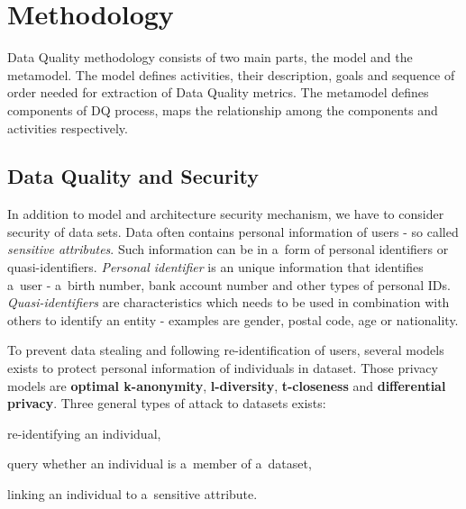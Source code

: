 \chapter{Methodology}\label{ch:methodology}

Data Quality methodology consists of two main parts, the model and the metamodel.
The model defines activities, their description, goals and sequence of order needed for extraction of Data Quality metrics.
The metamodel defines components of DQ process, maps the relationship among the components and activities respectively.

\section{Data Quality and Security}

In addition to model and architecture security mechanism, we have to consider security of data sets.
Data often contains personal information of users - so called \textit{sensitive attributes}.
Such information can be in a~form of personal identifiers or quasi-identifiers.
\textit{Personal identifier} is an unique information that identifies a~user - a~birth number, bank account number and other types of personal IDs.
\textit{Quasi-identifiers} are characteristics which needs to be used in combination with others to identify an entity - examples are gender, postal code, age or nationality.

To prevent data stealing and following re-identification of users, several models exists to protect personal information of individuals in dataset.
Those privacy models are \textbf{optimal k-anonymity}, \textbf{l-diversity}, \textbf{t-closeness} and \textbf{differential privacy}.
Three general types of attack to datasets exists:
\begin{enumerate*}[label=(\roman*)]
    \item \label{itm:reident} re-identifying an individual,
    \item \label{itm:query} query whether an individual is a~member of a~dataset,
    \item \label{itm:linking} linking an individual to a~sensitive attribute.
\end{enumerate*}

